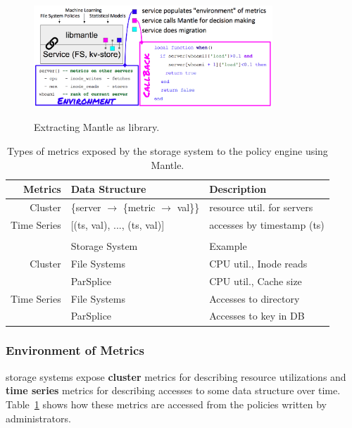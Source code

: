 \begin{figure}[t]
  \centering
  \includegraphics[width=0.8\textwidth]{./chapters/controlplane/parsplice/figures/mantle.png}\\

  \caption{Extracting Mantle as library.\label{fig:mantle}}

\end{figure}

\begin{table}
  \centering
  \ssp
  \begin{tabular}{ r | l | l }
  Metrics     & Data Structure & Description \\\hline
  Cluster     & \{server \(\rightarrow\) \{metric \(\rightarrow\) val\}\}
              & resource util. for servers \\
  Time Series & [(ts, val), ..., (ts, val)]
              & accesses by timestamp (ts) \\
  && \\
              & Storage System & Example \\\hline
  Cluster     & File Systems & CPU util., Inode reads \\
              & ParSplice    & CPU util., Cache size \\
  Time Series & File Systems & Accesses to directory \\
              & ParSplice    & Accesses to key in DB\\
  \end{tabular}
  \dsp
  \caption{Types of metrics exposed by the storage system to the policy engine using Mantle.\label{table:metrics}}
\end{table}

\subsubsection{Environment of Metrics} storage systems expose \textbf{cluster} metrics
for describing resource utilizations and \textbf{time series} metrics for
describing accesses to some data structure over time. Table~\ref{table:metrics}
shows how these metrics are accessed from the policies written by
administrators. 

